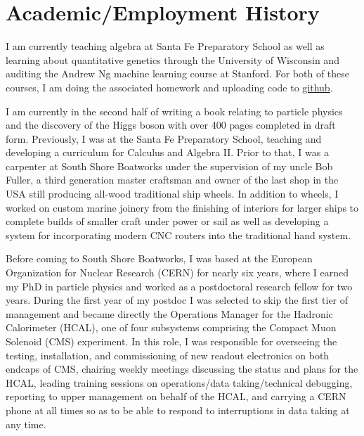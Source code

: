 \documentclass[10pt]{article} %
\begin{document}
\section{Academic/Employment History}

I am currently teaching algebra at Santa Fe Preparatory School as well as learning about quantitative genetics through the University of Wisconsin and auditing the Andrew Ng machine learning course at Stanford. For both of these courses, I am doing the associated homework and uploading code to \href{https://github.com/tmrhombus/CodingPractice}{github}. 

I am currently in the second half of writing a book relating to particle physics and the discovery of the Higgs boson with over 400 pages completed in draft form. Previously, I was at the Santa Fe Preparatory School, teaching and developing a curriculum for Calculus and Algebra II. Prior to that, I was a carpenter at South Shore Boatworks under the supervision of my uncle Bob Fuller, a third generation master craftsman and owner of the last shop in the USA still producing all-wood traditional ship wheels. In addition to wheels, I worked on custom marine joinery from the finishing of interiors for larger ships to complete builds of smaller craft under power or sail as well as developing a system for incorporating modern CNC routers into the traditional hand system.

\vspace{5pt}

Before coming to South Shore Boatworks, I was based at the European Organization for Nuclear Research (CERN) for nearly six years, where I earned my PhD in particle physics and worked as a postdoctoral research fellow for two years. During the first year of my postdoc I was selected to skip the first tier of management and became directly the Operations Manager for the Hadronic Calorimeter (HCAL), one of four subsystems comprising the Compact Muon Solenoid (CMS) experiment. In this role, I was responsible for overseeing the testing, installation, and commissioning of new readout electronics on both endcaps of CMS, chairing weekly meetings discussing the status and plans for the HCAL, leading training sessions on operations/data taking/technical debugging, reporting to upper management on behalf of the HCAL, and carrying a CERN phone at all times so as to be able to respond to interruptions in data taking at any time. 

\vspace{5pt}
\end{document}
